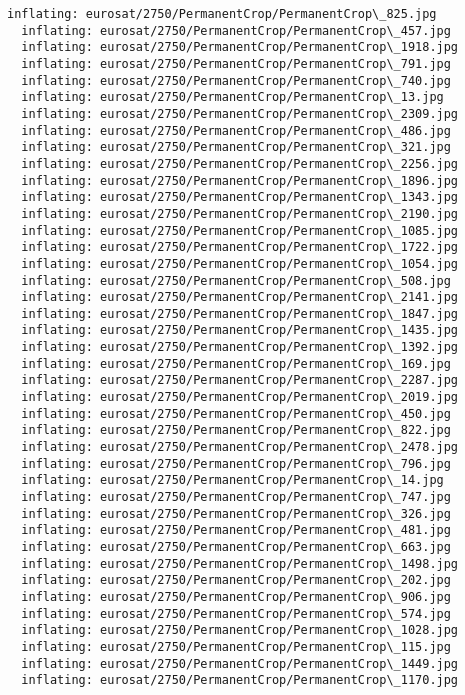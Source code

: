 \documentclass[11pt]{article}
\begin{document}
\begin{Verbatim}[commandchars=\\\{\}]
  inflating: eurosat/2750/PermanentCrop/PermanentCrop\_825.jpg
  inflating: eurosat/2750/PermanentCrop/PermanentCrop\_457.jpg
  inflating: eurosat/2750/PermanentCrop/PermanentCrop\_1918.jpg
  inflating: eurosat/2750/PermanentCrop/PermanentCrop\_791.jpg
  inflating: eurosat/2750/PermanentCrop/PermanentCrop\_740.jpg
  inflating: eurosat/2750/PermanentCrop/PermanentCrop\_13.jpg
  inflating: eurosat/2750/PermanentCrop/PermanentCrop\_2309.jpg
  inflating: eurosat/2750/PermanentCrop/PermanentCrop\_486.jpg
  inflating: eurosat/2750/PermanentCrop/PermanentCrop\_321.jpg
  inflating: eurosat/2750/PermanentCrop/PermanentCrop\_2256.jpg
  inflating: eurosat/2750/PermanentCrop/PermanentCrop\_1896.jpg
  inflating: eurosat/2750/PermanentCrop/PermanentCrop\_1343.jpg
  inflating: eurosat/2750/PermanentCrop/PermanentCrop\_2190.jpg
  inflating: eurosat/2750/PermanentCrop/PermanentCrop\_1085.jpg
  inflating: eurosat/2750/PermanentCrop/PermanentCrop\_1722.jpg
  inflating: eurosat/2750/PermanentCrop/PermanentCrop\_1054.jpg
  inflating: eurosat/2750/PermanentCrop/PermanentCrop\_508.jpg
  inflating: eurosat/2750/PermanentCrop/PermanentCrop\_2141.jpg
  inflating: eurosat/2750/PermanentCrop/PermanentCrop\_1847.jpg
  inflating: eurosat/2750/PermanentCrop/PermanentCrop\_1435.jpg
  inflating: eurosat/2750/PermanentCrop/PermanentCrop\_1392.jpg
  inflating: eurosat/2750/PermanentCrop/PermanentCrop\_169.jpg
  inflating: eurosat/2750/PermanentCrop/PermanentCrop\_2287.jpg
  inflating: eurosat/2750/PermanentCrop/PermanentCrop\_2019.jpg
  inflating: eurosat/2750/PermanentCrop/PermanentCrop\_450.jpg
  inflating: eurosat/2750/PermanentCrop/PermanentCrop\_822.jpg
  inflating: eurosat/2750/PermanentCrop/PermanentCrop\_2478.jpg
  inflating: eurosat/2750/PermanentCrop/PermanentCrop\_796.jpg
  inflating: eurosat/2750/PermanentCrop/PermanentCrop\_14.jpg
  inflating: eurosat/2750/PermanentCrop/PermanentCrop\_747.jpg
  inflating: eurosat/2750/PermanentCrop/PermanentCrop\_326.jpg
  inflating: eurosat/2750/PermanentCrop/PermanentCrop\_481.jpg
  inflating: eurosat/2750/PermanentCrop/PermanentCrop\_663.jpg
  inflating: eurosat/2750/PermanentCrop/PermanentCrop\_1498.jpg
  inflating: eurosat/2750/PermanentCrop/PermanentCrop\_202.jpg
  inflating: eurosat/2750/PermanentCrop/PermanentCrop\_906.jpg
  inflating: eurosat/2750/PermanentCrop/PermanentCrop\_574.jpg
  inflating: eurosat/2750/PermanentCrop/PermanentCrop\_1028.jpg
  inflating: eurosat/2750/PermanentCrop/PermanentCrop\_115.jpg
  inflating: eurosat/2750/PermanentCrop/PermanentCrop\_1449.jpg
  inflating: eurosat/2750/PermanentCrop/PermanentCrop\_1170.jpg

\end{Verbatim}
\end{document}
